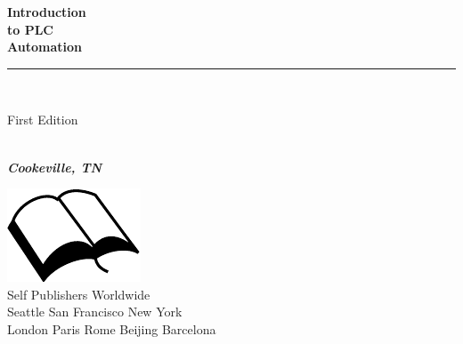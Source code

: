 \documentclass{book}
\makeatletter
\newcommand{\booksubtitle}{Practical Excercises}
\newcommand{\authorsubtitle}{Cookeville, TN}
\newcommand{\bookauthor}{\@author}
\makeatother
\begin{document}
\begin{titlepage}
\begin{flushleft}

\textbf{\fontsize{48}{54}\selectfont Introduction \\ to PLC \\ \vskip6pt Automation}

\par\noindent\rule{\textwidth}{4pt}\\


\begin{flushright}
\Large First Edition
\end{flushright}

\vspace{\fill}

\textbf{\large \bookauthor}\\[3.5pt]
\textbf{\large \textit{\authorsubtitle}}

\vspace{\fill}

\begin{center}
\includegraphics{booksvg.pdf}\\[4pt]
\small{Self Publishers Worldwide\\
Seattle San Francisco New York\\
London Paris Rome Beijing Barcelona}
\end{center}

\end{flushleft}
\end{titlepage}
\restoregeometry
\end{document}
